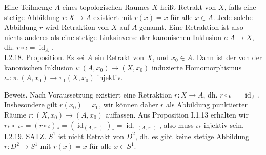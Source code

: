 \documentclass[10pt]{article}
\begin{document}
Eine Teilmenge $A$ eines topologischen Raumes $X$ heißt Retrakt von $X$, falls eine stetige Abbildung $r: X \rightarrow A$ existiert mit $r(x)=x$ für alle $x \in A$. Jede solche Abbildung $r$ wird Retraktion von $X$ auf $A$ genannt. Eine Retraktion ist also nichts anderes als eine stetige Linksinverse der kanonischen Inklusion $\iota: A \rightarrow X$, dh. $r \circ \iota=\operatorname{id}_{A}$.\\
I.2.18. Proposition. Es sei $A$ ein Retrakt von $X$, und $x_{0} \in A$. Dann ist der von der kanonischen Inklusion $\iota:\left(A, x_{0}\right) \rightarrow\left(X, x_{0}\right)$ induzierte Homomorphismus $\iota_{*}: \pi_{1}\left(A, x_{0}\right) \rightarrow \pi_{1}\left(X, x_{0}\right)$ injektiv.

Beweis. Nach Voraussetzung existiert eine Retraktion $r: X \rightarrow A$, dh. $r \circ \iota=$ $\operatorname{id}_{A}$. Insbesondere gilt $r\left(x_{0}\right)=x_{0}$, wir können daher $r$ als Abbildung punktierter Räume $r:\left(X, x_{0}\right) \rightarrow\left(A, x_{0}\right)$ auffassen. Aus Proposition I.1.13 erhalten wir $r_{*} \circ$ $\iota_{*}=(r \circ \iota)_{*}=\left(\operatorname{id}_{\left(A, x_{0}\right)}\right)_{*}=\operatorname{id}_{\pi_{1}\left(A, x_{0}\right)}$, also muss $\iota_{*}$ injektiv sein.\\
I.2.19. SATZ. $S^{1}$ ist nicht Retrakt von $D^{2}$, dh. es gibt keine stetige Abbildung $r: D^{2} \rightarrow S^{1}$ mit $r(x)=x$ für alle $x \in S^{1}$.
\end{document}
